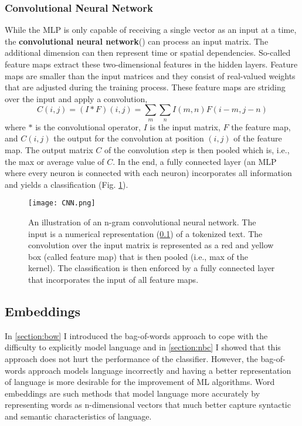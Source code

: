 \subsubsection{Convolutional Neural Network}
While the MLP is only capable of receiving a single vector as an input at a time, the \textbf{convolutional neural network}() can process an input matrix. The additional dimension can then represent time or spatial dependencies. So-called feature maps extract these two-dimensional features in the hidden layers. Feature maps are smaller than the input matrices and they consist of real-valued weights that are adjusted during the training process. These feature maps are striding over the input and apply a convolution,
\[C(i,j) = (I \ast F)(i,j) = \sum_m \sum_n I(m, n) F(i-m, j-n)\] where $\ast$ is the convolutional operator, $I$ is the input matrix, $F$ the feature map, and $C(i,j)$ the output for the convolution at position $(i,j)$ of the feature map. The output matrix $C$ of the convolution step is then pooled which is, i.e., the max or average value of $C$. In the end, a fully connected layer (an MLP where every neuron is connected with each neuron) incorporates all information and yields a classification (Fig. \ref{fig:cnn}).
\begin{figure}[h!]
    \centering
    \texttt{[image: CNN.png]}
    \caption{An illustration of an n-gram convolutional neural network. The input is a numerical representation (\ref{section:embeddings}) of a tokenized text. The convolution over the input matrix is represented as a red and yellow box (called feature map) that is then pooled (i.e., max of the kernel). The classification is then enforced by a fully connected layer that incorporates the input of all feature maps.}
    \label{fig:cnn}
\end{figure}

\subsection{Embeddings}\label{section:embeddings}
In \ref{section:bow} I introduced the bag-of-words approach to cope with the difficulty to explicitly model language and in \ref{section:nbc} I showed that this approach does not hurt the performance of the classifier. However, the bag-of-words approach models language incorrectly and having a better representation of language is more desirable for the improvement of ML algorithms. Word embeddings are such methods that model language more accurately by representing words as n-dimensional vectors that much better capture syntactic and semantic characteristics of language.

